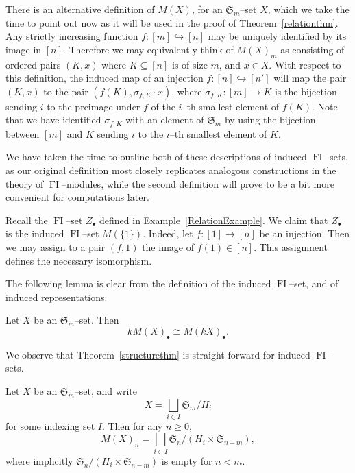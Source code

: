 \documentclass[ALCO,ThmDefs,Unicode,epreuves]{cedram}
\DeclareMathOperator{\FI}{FI}
\newcommand{\Sn}{\mathfrak{S}}
\newcommand{\dt}{\bullet}
\begin{document}
\begin{remark}\label{otherdescription}
There is an alternative definition of $M(X)$, for an $\Sn_m$--set $X$, which we take the time to point out now as it will be used in the proof of Theorem~\ref{relationthm}. Any strictly increasing function $f:[m] \hookrightarrow [n]$ may be uniquely identified by its image in $[n]$. Therefore we may equivalently think of $M(X)_m$ as consisting of ordered pairs $(K,x)$ where $K \subseteq [n]$ is of size $m$, and $x \in X$. With respect to this definition, the induced map of an injection $f:[n] \hookrightarrow [n']$ will map the pair $(K,x)$ to the pair $(f(K),\sigma_{f,K} \cdot x)$, where $\sigma_{f,K}: [m] \rightarrow K$ is the bijection sending $i$ to the preimage under $f$ of the $i$--th smallest element of $f(K)$. Note that we have identified $\sigma_{f,K}$ with an element of $\Sn_m$ by using the bijection between $[m]$ and $K$ sending $i$ to the $i$--th smallest element of $K$.

We have taken the time to outline both of these descriptions of induced $\FI$--sets, as our original definition most closely replicates analogous constructions in the theory of $\FI$--modules, while the second definition will prove to be a bit more convenient for computations later.
\end{remark}

\begin{example}
Recall the $\FI$--set $Z_\dt$ defined in Example~\ref{RelationExample}. We claim that $Z_\dt$ is the induced $\FI$--set $M(\{1\})$. Indeed, let $f:[1] \rightarrow [n]$ be an injection. Then we may assign to a pair $(f,1)$ the image of $f(1) \in [n]$. This assignment defines the necessary isomorphism.
\end{example}

The following lemma is clear from the definition of the induced $\FI$--set, and of induced representations. 
\begin{lemma}
Let $X$ be an $\Sn_m$--set. Then 
\[
k M(X)_\dt \cong M(k X)_\dt.
\]
\end{lemma}

We observe that Theorem~\ref{structurethm} is straight-forward for induced $\FI$--sets.

\begin{lemma}\label{inducedversion}
Let $X$ be an $\Sn_m$--set, and write
\[
X = \bigsqcup_{i \in I} \Sn_m/H_i
\]
for some indexing set $I$. Then for any $n \geq 0$,
\[
M(X)_n = \bigsqcup_{i \in I} \Sn_n/(H_i \times \Sn_{n-m}),
\]
where implicitly $\Sn_n/(H_i \times \Sn_{n-m})$ is empty for $n < m$.
\end{lemma}
\end{document}
